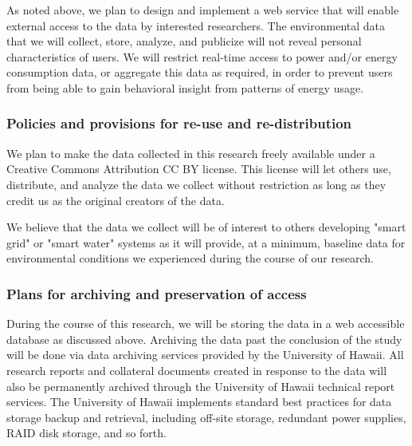 \documentclass{proposalnsf}
\begin{document}
As noted above, we plan to design and implement a web service that will
enable external access to the data by interested researchers.  The
environmental data that we will collect, store, analyze, and publicize will
not reveal personal characteristics of users.  We will restrict real-time
access to power and/or energy consumption data, or aggregate this data as
required, in order to prevent users from being able to gain behavioral
insight from patterns of energy usage.

\subsubsection*{Policies and provisions for re-use and re-distribution}

We plan to make the data collected in this research freely available under
a Creative Commons Attribution CC BY license.  This license will let others
use, distribute, and analyze the data we collect without restriction as
long as they credit us as the original creators of the data.

We believe that the data we collect will be of interest to others
developing "smart grid" or "smart water" systems as it will provide, at a
minimum, baseline data for environmental conditions we experienced during
the course of our research.

\subsubsection*{Plans for archiving and preservation of access}

During the course of this research, we will be storing the data in a web
accessible database as discussed above.  Archiving the data past the
conclusion of the study will be done via data archiving services provided
by the University of Hawaii.  All research reports and collateral documents
created in response to the data will also be permanently archived through
the University of Hawaii technical report services.  The University of
Hawaii implements standard best practices for data storage backup and
retrieval, including off-site storage, redundant power supplies, RAID disk
storage, and so forth.
\end{document}
